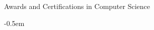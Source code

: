 \documentclass{resume} %
\begin{document}
\begin{rSection}{Awards and Certifications in Computer Science}
\begin{list}{}{
        \setlength{\leftmargin}{0.0em}
        \itemsep -0.5em
      }
    \end{list}
\end{rSection}

 
   
\end{document}
